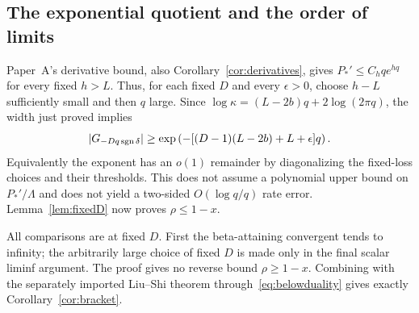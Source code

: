 \subsection{The exponential quotient and the order of limits}
Paper~A's derivative bound, also Corollary~\ref{cor:derivatives}, gives
$P_*'\le C_hq e^{hq}$ for every fixed $h>L$. Thus, for each fixed $D$ and every $\epsilon>0$, choose $h-L$ sufficiently small and then $q$ large. Since $\log\kappa=(L-2b)q+2\log(2\pi q)$, the width just proved implies
\[
 |G_{-Dq\operatorname{sgn}\delta}|
 \ge\exp\left(-[(D-1)(L-2b)+L+\epsilon]q\right).
\]
Equivalently the exponent has an $o(1)$ remainder by diagonalizing the fixed-loss choices and their thresholds. This does not assume a polynomial upper bound on $P_*'/\Lambda$ and does not yield a two-sided $O(\log q/q)$ rate error. Lemma~\ref{lem:fixedD} now proves $\rho\le1-x$.

All comparisons are at fixed $D$. First the beta-attaining convergent tends to infinity; the arbitrarily large choice of fixed $D$ is made only in the final scalar liminf argument. The proof gives no reverse bound $\rho\ge1-x$. Combining with the separately imported Liu--Shi theorem through~\eqref{eq:belowduality} gives exactly Corollary~\ref{cor:bracket}.
\label{end:below-assembly}
